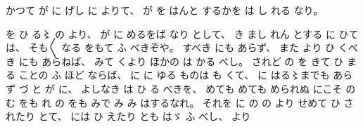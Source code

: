 
%
かつて
が
に
げし
に
よりて、
%
が
を
はんと
するかを
は
し
れる
なり。

%
を
ひ
る〻%
の
より、
%
が
に
めるをば
なり
として、
%
き
まし
れん
とする
に
ひては、
%
そも〳〵
なる
をもて
ふ
べきぞや。
%
すべき
にも
あらず、
%
また
より
ひ
くべき
にも
あらねば、
%
みて%
くより
ほかの
は
かる
べし。
%
されど
の
を
きて
ひ
まる
ことの
ふ
%
ほど
ならば、
%
に
に
ゆる
ものは
も
くて、
%
に
はる〻までも%
あらず
づ
と
が
に、
%
よしなき
は
ひ
る
べきを、
%
めても
めても
められぬ
にこそ
の
む%
をも
れ
の
をも
みで
み
み
はするなれ。
%
それを
に
の
の
より
せめて
ひ
されたり
とて、
%
には
ひ
えたり
とも
はゞ%
ふ
べし、
%
より%
